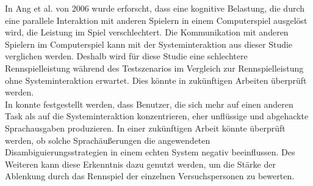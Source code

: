 \documentclass[12pt,a4paper]{scrartcl}
\begin{document}
In Ang et al. von 2006 wurde erforscht, dass eine kognitive Belastung, die durch eine parallele Interaktion mit anderen Spielern in einem Computerspiel ausgelöst wird, die Leistung im Spiel verschlechtert.  Die Kommunikation mit anderen Spielern im Computerspiel kann mit der Systeminteraktion aus dieser Studie verglichen werden. Deshalb wird für diese Studie eine schlechtere Rennspielleistung während des Testszenarios im Vergleich zur Rennspielleistung ohne Systeminteraktion erwartet. Dies könnte in zukünftigen Arbeiten überprüft werden.\\
 In \cite{Wozhcd} konnte festgestellt werden, dass Benutzer, die sich mehr auf einen anderen Task als auf die Systeminteraktion konzentrieren, eher unflüssige und abgehackte Sprachausgaben produzieren. In einer zukünftigen Arbeit könnte überprüft werden, ob solche Sprachäußerungen die angewendeten Disambiguierungsstrategien in einem echten System negativ beeinflussen.
Des Weiteren kann diese Erkenntnis dazu genutzt werden, um die Stärke der Ablenkung durch das Rennspiel der einzelnen Versuchspersonen zu bewerten. 
\end{document}

